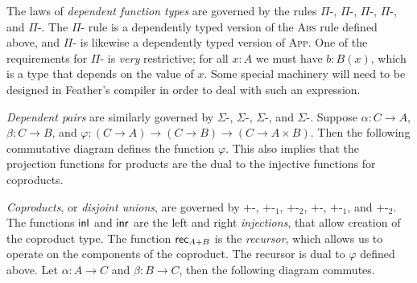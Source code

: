 \documentclass[UKenglish, 11pt, a4paper, parskip=half]{scrbook}
\begin{document}

The laws of \textit{dependent function types} are governed by the rules \( \Pi \)-\rform, \( \Pi \)-\rintro, \( \Pi \)-\relim, \( \Pi \)-\rcomp, and \( \Pi \)-\runiq.
The \( \Pi \)-\rintro{} rule is a dependently typed version of the \textsc{Abs} rule defined above, and \( \Pi \)-\relim{} is likewise a dependently typed version of \textsc{App}.
One of the requirements for \( \Pi \)-\rintro{} is \textit{very} restrictive; for all \( x:A \) we must have \( b:B(x) \), which is a type that depends on the value of \( x \).
Some special machinery will need to be designed in Feather's compiler in order to deal with such an expression.

\textit{Dependent pairs} are similarly governed by \( \Sigma \)-\rform, \( \Sigma \)-\rintro, \( \Sigma \)-\relim, and \( \Sigma \)-\rcomp.
Suppose \( \alpha : C \to A \), \( \beta : C \to B \), and \( \varphi : (C \to A) \to (C \to B) \to (C \to A \times B) \).
Then the following commutative diagram defines the function \( \varphi \).
This also implies that the projection functions for products are the dual to the injective functions for coproducts.

\begin{center}
\end{center}

\textit{Coproducts}, or \textit{disjoint unions}, are governed by \( + \)-\rform, \( + \)-\rintro\({}_1\), \( + \)-\rintro\({}_2\), \( + \)-\relim, \( + \)-\rcomp\({}_1\), and \( + \)-\rcomp\({}_2\).
The functions \( {\mathsf{inl}} \) and \( {\mathsf{inr}} \) are the left and right \textit{injections}, that allow creation of the coproduct type.
The function \( \mathsf{rec}_{A + B} \) is the \textit{recursor}, which allows us to operate on the components of the coproduct.
The recursor is dual to \( \varphi \) defined above.
Let \( \alpha \colon A \to C \) and \( \beta \colon B \to C \), then the following diagram commutes.
\end{document}
